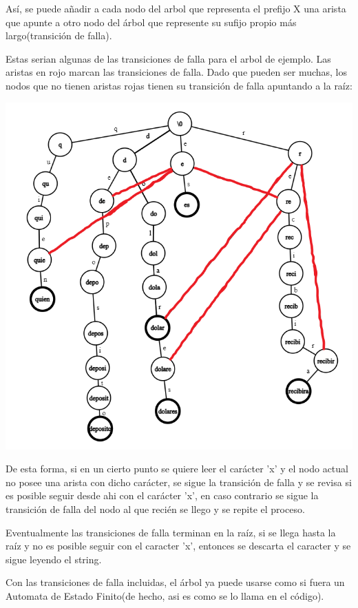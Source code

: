 \documentclass{article}
\begin{document}
Así, se puede añadir a cada nodo del arbol que representa el prefijo X una arista que apunte a otro nodo del árbol que represente su 
sufijo propio más largo(transición de falla). 

Estas serian algunas de las transiciones de falla para el arbol de ejemplo. Las aristas en rojo marcan las transiciones de falla. Dado que pueden ser muchas,
los nodos que no tienen aristas rojas tienen su transición de falla apuntando a la raíz:

\includegraphics[scale=0.5]{Imagenes/trie1_transiciones_falla.png}


De esta forma, si en un cierto punto se quiere leer el carácter 'x' y el nodo actual no posee una arista con dicho carácter,
se sigue la transición de falla y se revisa si es posible seguir desde ahi con el carácter 'x', en caso contrario se sigue la transición de falla del nodo al que recién se llego y se repite el proceso.

Eventualmente las transiciones de falla terminan en la raíz, si se llega hasta la raíz y no es posible seguir con el caracter 'x', entonces se descarta el caracter y se sigue leyendo el string.

Con las transiciones de falla incluidas, el árbol ya puede usarse como si fuera un Automata de Estado Finito(de hecho, asi es como se lo llama en el código).
\end{document}
